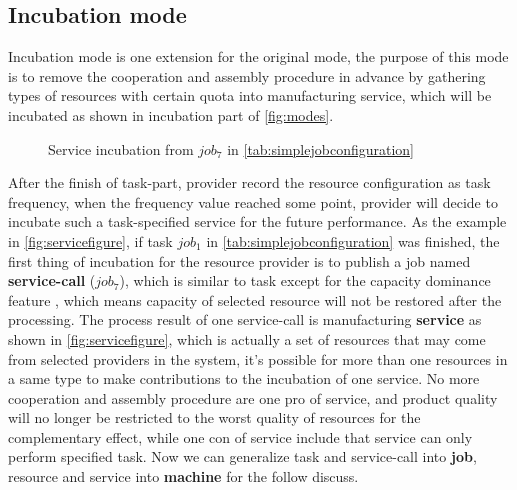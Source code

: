 \subsection{Incubation mode} %
\label{sub:incubation_mode}
Incubation mode is one extension for the original mode, the purpose of this mode is to remove the cooperation and assembly procedure in advance by gathering types of resources with certain quota into manufacturing service, which will be incubated as shown in incubation part of \autoref{fig:modes}.
\begin{figure}[htbp]
    \centering
    \scriptsize
    \resizebox{.65\textwidth}{!}{}
    \caption{Service incubation from $job_7$ in \autoref{tab:simplejobconfiguration}}
    \label{fig:servicefigure}
\end{figure}
After the finish of task-part, provider record the resource configuration as task frequency, when the frequency value reached some point, provider will decide to incubate such a task-specified service for the future performance. As the example in \autoref{fig:servicefigure}, if task $job_1$ in \autoref{tab:simplejobconfiguration} was finished, the first thing of incubation for the resource provider is to publish a job named \textbf{service-call} ($job_7$), which is similar to task except for the capacity dominance feature , which means capacity of selected resource will not be restored after the processing. The process result of one service-call is manufacturing \textbf{service} as shown in \autoref{fig:servicefigure}, which is actually a set of resources that may come from selected providers in the system, it's possible for more than one resources in a same type to make contributions to the incubation of one service. No more cooperation and assembly procedure are one pro of service, and product quality will no longer be restricted to the worst quality of resources for the complementary effect, while one con of service include that service can only perform specified task.
Now we can generalize task and service-call into \textbf{job}, resource and service into \textbf{machine} for the follow discuss.

